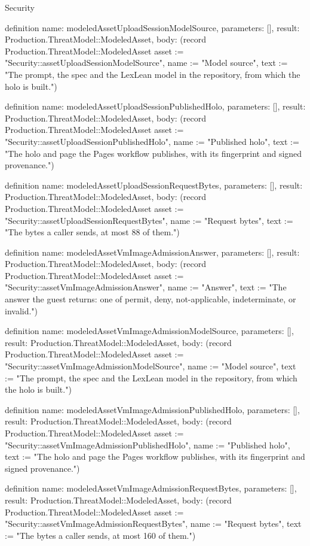 \begin{lexlean}{Security}
\begin{semanticmodule}
definition{
  name: modeledAssetUploadSessionModelSource,
  parameters: [],
  result: Production.ThreatModel::ModeledAsset,
  body: (record Production.ThreatModel::ModeledAsset {asset := "Security::assetUploadSessionModelSource", name := "Model source", text := "The prompt, the spec and the LexLean model in the repository, from which the holo is built."})
}

definition{
  name: modeledAssetUploadSessionPublishedHolo,
  parameters: [],
  result: Production.ThreatModel::ModeledAsset,
  body: (record Production.ThreatModel::ModeledAsset {asset := "Security::assetUploadSessionPublishedHolo", name := "Published holo", text := "The holo and page the Pages workflow publishes, with its fingerprint and signed provenance."})
}

definition{
  name: modeledAssetUploadSessionRequestBytes,
  parameters: [],
  result: Production.ThreatModel::ModeledAsset,
  body: (record Production.ThreatModel::ModeledAsset {asset := "Security::assetUploadSessionRequestBytes", name := "Request bytes", text := "The bytes a caller sends, at most 88 of them."})
}

definition{
  name: modeledAssetVmImageAdmissionAnswer,
  parameters: [],
  result: Production.ThreatModel::ModeledAsset,
  body: (record Production.ThreatModel::ModeledAsset {asset := "Security::assetVmImageAdmissionAnswer", name := "Answer", text := "The answer the guest returns: one of permit, deny, not-applicable, indeterminate, or invalid."})
}

definition{
  name: modeledAssetVmImageAdmissionModelSource,
  parameters: [],
  result: Production.ThreatModel::ModeledAsset,
  body: (record Production.ThreatModel::ModeledAsset {asset := "Security::assetVmImageAdmissionModelSource", name := "Model source", text := "The prompt, the spec and the LexLean model in the repository, from which the holo is built."})
}

definition{
  name: modeledAssetVmImageAdmissionPublishedHolo,
  parameters: [],
  result: Production.ThreatModel::ModeledAsset,
  body: (record Production.ThreatModel::ModeledAsset {asset := "Security::assetVmImageAdmissionPublishedHolo", name := "Published holo", text := "The holo and page the Pages workflow publishes, with its fingerprint and signed provenance."})
}

definition{
  name: modeledAssetVmImageAdmissionRequestBytes,
  parameters: [],
  result: Production.ThreatModel::ModeledAsset,
  body: (record Production.ThreatModel::ModeledAsset {asset := "Security::assetVmImageAdmissionRequestBytes", name := "Request bytes", text := "The bytes a caller sends, at most 160 of them."})
}


\end{semanticmodule}
\end{lexlean}
